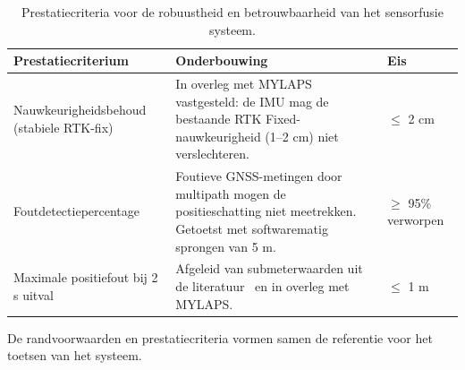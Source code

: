 \begin{table}[htbp]
    \centering
    \caption{Prestatiecriteria voor de robuustheid en betrouwbaarheid van het sensorfusie systeem.}
    \label{tab:prestatiecriteria}
    \renewcommand{\arraystretch}{1.3}
    \begin{tabularx}{\textwidth}{|l|X|l|}
        \hline
        \rowcolor{green!20}
        \textbf{Prestatiecriterium} & \textbf{Onderbouwing} & \textbf{Eis} \\ 
        \hline

        Nauwkeurigheidsbehoud (stabiele RTK-fix) &
        In overleg met MYLAPS vastgesteld: de IMU mag de bestaande RTK 
        Fixed-nauwkeurigheid (1--2 cm) niet verslechteren. &
        $\leq$ 2 cm \\ \hline

        Foutdetectiepercentage &
        Foutieve GNSS-metingen door multipath mogen de positieschatting niet 
        meetrekken. Getoetst met softwarematig sprongen van 5 m. &
        $\geq$ 95\% verworpen \\ \hline

        Maximale positiefout bij 2 s uitval &
        Afgeleid van submeterwaarden uit de literatuur~\cite{li2017rtk} en in 
        overleg met MYLAPS. & $\leq$ 1 m \\ \hline

    \end{tabularx}
\end{table}

De randvoorwaarden en prestatiecriteria vormen samen de referentie voor het toetsen van het systeem.

\newpage